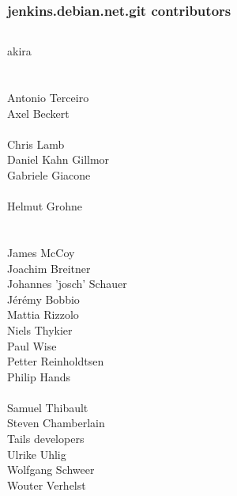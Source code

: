 \documentclass[14pt]{beamer}
\begin{document}
\begin{frame}
 \frametitle{jenkins.debian.net.git contributors}
 \begin{center}
  \begin{columns}
   \small
    {akira} \\
     \\
     \\
    {Antonio Terceiro} \\
    {Axel Beckert} \\
     \\
    {Chris Lamb} \\
    {Daniel Kahn Gillmor} \\
    {Gabriele Giacone} \\
     \\
    Helmut Grohne \\
     \\
     \\
    {James McCoy} \\
    {Joachim Breitner} \\
    {Johannes 'josch' Schauer} \\
    {Jérémy Bobbio} \\
    {Mattia Rizzolo} \\
    {Niels Thykier} \\
    {Paul Wise} \\
    {Petter Reinholdtsen} \\
    {Philip Hands} \\
     \\
    {Samuel Thibault} \\
    {Steven Chamberlain} \\
    {Tails developers} \\
    {Ulrike Uhlig} \\
    {Wolfgang Schweer} \\
    {Wouter Verhelst} \\
  \end{columns}
 \end{center}
\end{frame}
\end{document}
